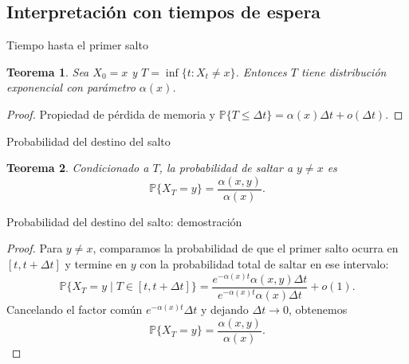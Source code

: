 \documentclass[aspectratio=169]{beamer}
\theoremstyle{plain}
\newtheorem{teorema}{Teorema}
\theoremstyle{definition}
\newcommand{\Prob}{\mathbb{P}}
\newcommand{\1}{\mathbf{1}}
\begin{document}
\subsection{Interpretación con tiempos de espera}

\begin{frame}{Tiempo hasta el primer salto}
  \begin{teorema}
    Sea $X_0 = x$ y $T = \inf\{t: X_t \neq x\}$. Entonces $T$ tiene distribución exponencial con parámetro $\alpha(x)$.
  \end{teorema}
  
  \begin{proof}
    Propiedad de pérdida de memoria y $\Prob\{T \leq \Delta t\} = \alpha(x)\Delta t + o(\Delta t)$.
  \end{proof}
  
  \vspace{0.5cm}
  
  \begin{center}
  \end{center}
\end{frame}

\begin{frame}{Probabilidad del destino del salto}
  \begin{teorema}
    Condicionado a $T$, la probabilidad de saltar a $y \neq x$ es
    \[ \Prob\{X_T = y\} = \frac{\alpha(x,y)}{\alpha(x)}. \]
  \end{teorema}
\end{frame}

\begin{frame}{Probabilidad del destino del salto: demostración}
  \begin{proof}
    Para $y\neq x$, comparamos la probabilidad de que el primer salto ocurra en
    $[t,t+\Delta t]$ y termine en $y$ con la probabilidad total de saltar en ese intervalo:
    \[
      \Prob\{X_T=y\mid T\in[t,t+\Delta t]\}
      = \frac{e^{-\alpha(x)t}\alpha(x,y)\Delta t}{e^{-\alpha(x)t}\alpha(x)\Delta t} + o(1).
    \]
    Cancelando el factor común $e^{-\alpha(x)t}\Delta t$ y dejando $\Delta t\to 0$,
    obtenemos
    \[
      \Prob\{X_T=y\} = \frac{\alpha(x,y)}{\alpha(x)}.
    \]
  \end{proof}
\end{frame}
\end{document}
